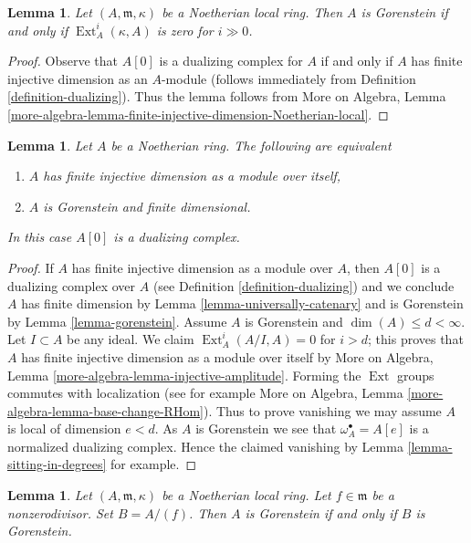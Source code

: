 \documentclass{stacks-project}
\theoremstyle{plain}
\newtheorem{lemma}[subsection]{Lemma}
\theoremstyle{definition}
\theoremstyle{remark}
\numberwithin{equation}{subsection}
\def\Ext{\mathop{\mathrm{Ext}}\nolimits}
\begin{document}
\begin{lemma}
\label{lemma-gorenstein-ext}
Let $(A, \mathfrak m, \kappa)$ be a Noetherian local ring.
Then $A$ is Gorenstein if and only if $\Ext^i_A(\kappa, A)$
is zero for $i \gg 0$.
\end{lemma}

\begin{proof}
Observe that $A[0]$ is a dualizing complex for $A$ if and only
if $A$ has finite injective dimension as an $A$-module
(follows immediately from Definition \ref{definition-dualizing}).
Thus the lemma follows from More on Algebra, Lemma
\ref{more-algebra-lemma-finite-injective-dimension-Noetherian-local}.
\end{proof}

\begin{lemma}
\label{lemma-characterize-gorenstein}
Let $A$ be a Noetherian ring. The following are equivalent
\begin{enumerate}
\item $A$ has finite injective dimension as a module over itself,
\item $A$ is Gorenstein and finite dimensional.
\end{enumerate}
In this case $A[0]$ is a dualizing complex.
\end{lemma}

\begin{proof}
If $A$ has finite injective dimension as a module over $A$, then
$A[0]$ is a dualizing complex over $A$
(see Definition \ref{definition-dualizing})
and we conclude $A$ has finite dimension by
Lemma \ref{lemma-universally-catenary} and
is Gorenstein by Lemma \ref{lemma-gorenstein}.
Assume $A$ is Gorenstein and $\dim(A) \leq d < \infty$.
Let $I \subset A$ be any ideal. We claim $\Ext^i_A(A/I, A) = 0$
for $i > d$; this proves that $A$ has finite injective
dimension as a module over itself by
More on Algebra, Lemma \ref{more-algebra-lemma-injective-amplitude}.
Forming the $\Ext$ groups commutes with localization (see for example
More on Algebra, Lemma \ref{more-algebra-lemma-base-change-RHom}).
Thus to prove vanishing we may assume $A$ is local of
dimension $e < d$. As $A$ is Gorenstein we see that
$\omega_A^\bullet = A[e]$ is a normalized dualizing complex.
Hence the claimed vanishing by Lemma \ref{lemma-sitting-in-degrees}
for example.
\end{proof}

\begin{lemma}
\label{lemma-gorenstein-divide-by-nonzerodivisor}
Let $(A, \mathfrak m, \kappa)$
be a Noetherian local ring. Let $f \in \mathfrak m$ be a
nonzerodivisor. Set $B = A/(f)$. Then $A$ is Gorenstein if and
only if $B$ is Gorenstein.
\end{lemma}
\end{document}
